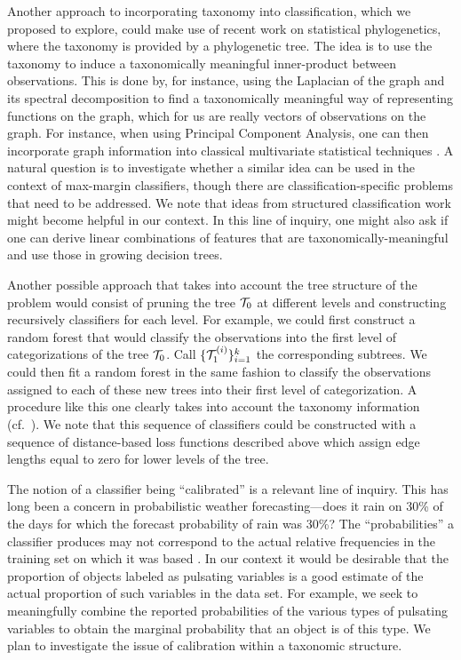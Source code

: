 Another approach to incorporating taxonomy into classification, which we
proposed to explore, could make use of recent work on statistical phylogenetics,
where the taxonomy is provided by a phylogenetic tree.  The idea
\citep{elithesis} is to use the taxonomy to induce a taxonomically meaningful
inner-product between observations. This is done by, for instance, using the
Laplacian of the graph and its spectral decomposition to find a taxonomically
meaningful way of representing functions on the graph, which for us are really
vectors of observations on the graph. For instance, when using Principal
Component Analysis, one can then incorporate graph information into classical
multivariate statistical techniques \cite{PurdomAnalyzingDataWithGraphs08}. A
natural question is to investigate whether a similar idea can be used in the
context of max-margin classifiers, though there are classification-specific
problems that need to be addressed. We note that ideas from structured
classification work \citep{bcmt-lmmsc-04} might become helpful in our context. In
this line of inquiry, one might also ask if one can derive linear combinations
of features that are taxonomically-meaningful and use those in growing decision
trees.

Another possible approach that takes  into account the tree structure of the
problem would consist of pruning the tree ${\cal T}_0$ at different levels and
constructing recursively classifiers for each level.  For example, we could
first construct a random forest that would classify the observations into the
first level of categorizations of the tree ${\cal T}_0$. Call $\{{\cal
T}_1^{(i)}\}_{i=1}^k$ the corresponding subtrees. We could then fit a random
forest in the same fashion to classify the observations assigned to each of
these new trees into their first level of categorization. A procedure like this
one clearly takes into account the taxonomy information (cf.\
\citealt{CesaBianchi06}).  We note that this sequence of classifiers could be
constructed with a sequence of distance-based loss functions described above
which assign edge lengths equal to zero for lower levels of the tree.

The notion of a classifier being ``calibrated'' is a relevant line of inquiry.
This has long been a concern in probabilistic weather forecasting---does it rain
on 30\% of the days for which the forecast probability of rain was 30\%?  The
``probabilities'' a classifier produces may not correspond to the actual
relative frequencies in the training set on which it was based
\citep{niculescu05:obtaining}.  In our context it would be desirable that the
proportion of objects labeled as pulsating variables is a good estimate of the
actual proportion of such variables in the data set.  For example, we seek  to
meaningfully combine  the reported probabilities of the various types of
pulsating variables to obtain the marginal probability that an object is of this
type.  We plan to investigate the issue of calibration within a taxonomic
structure.

